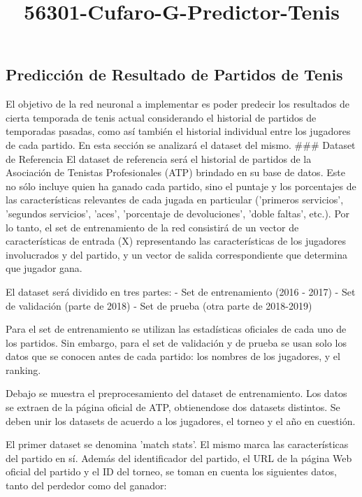 \documentclass[11pt]{article}
\title{56301-Cufaro-G-Predictor-Tenis}
\begin{document}
    
    
    \maketitle
    
    

    
    \subsection{Predicción de Resultado de Partidos de
Tenis}\label{predicciuxf3n-de-resultado-de-partidos-de-tenis}

El objetivo de la red neuronal a implementar es poder predecir los
resultados de cierta temporada de tenis actual considerando el historial
de partidos de temporadas pasadas, como así también el historial
individual entre los jugadores de cada partido. En esta sección se
analizará el dataset del mismo. \#\#\# Dataset de Referencia El dataset
de referencia será el historial de partidos de la Asociación de Tenistas
Profesionales (ATP) brindado en su base de datos. Este no sólo incluye
quien ha ganado cada partido, sino el puntaje y los porcentajes de las
características relevantes de cada jugada en particular ('primeros
servicios', 'segundos servicios', 'aces', 'porcentaje de devoluciones',
'doble faltas', etc.). Por lo tanto, el set de entrenamiento de la red
consistirá de un vector de características de entrada (X) representando
las características de los jugadores involucrados y del partido, y un
vector de salida correspondiente que determina que jugador gana.

El dataset será dividido en tres partes: - Set de entrenamiento (2016 -
2017) - Set de validación (parte de 2018) - Set de prueba (otra parte de
2018-2019)

Para el set de entrenamiento se utilizan las estadísticas oficiales de
cada uno de los partidos. Sin embargo, para el set de validación y de
prueba se usan solo los datos que se conocen antes de cada partido: los
nombres de los jugadores, y el ranking.

Debajo se muestra el preprocesamiento del dataset de entrenamiento. Los
datos se extraen de la página oficial de ATP, obtienendose dos datasets
distintos. Se deben unir los datasets de acuerdo a los jugadores, el
torneo y el año en cuestión.

El primer dataset se denomina 'match stats'. El mismo marca las
características del partido en sí. Además del identificador del partido,
el URL de la página Web oficial del partido y el ID del torneo, se toman
en cuenta los siguientes datos, tanto del perdedor como del ganador:
\end{document}
